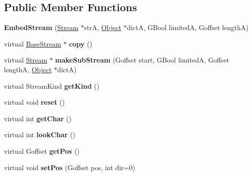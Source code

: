 \subsection*{Public Member Functions}
\begin{DoxyCompactItemize}
\item 
\mbox{\label{class_embed_stream_a624ea287f9ba21a0ea17b5d20aa50df6}} 
{\bfseries Embed\+Stream} (\hyperlink{class_stream}{Stream} $\ast$strA, \hyperlink{class_object}{Object} $\ast$dictA, G\+Bool limitedA, Goffset lengthA)
\item 
\mbox{\label{class_embed_stream_aeffc51f2d93a1c34e88bfc3a77dc9ee7}} 
virtual \hyperlink{class_base_stream}{Base\+Stream} $\ast$ {\bfseries copy} ()
\item 
\mbox{\label{class_embed_stream_a6165cfe55a7d4c1e8a57ff18ef4bd179}} 
virtual \hyperlink{class_stream}{Stream} $\ast$ {\bfseries make\+Sub\+Stream} (Goffset start, G\+Bool limitedA, Goffset lengthA, \hyperlink{class_object}{Object} $\ast$dictA)
\item 
\mbox{\label{class_embed_stream_a6e8cf15102919fdb0f79b0d3ea5d5063}} 
virtual Stream\+Kind {\bfseries get\+Kind} ()
\item 
\mbox{\label{class_embed_stream_a1729f8382772524a2837396d1674dd20}} 
virtual void {\bfseries reset} ()
\item 
\mbox{\label{class_embed_stream_afb5b8585b2438f2532fc8c9a8377989e}} 
virtual int {\bfseries get\+Char} ()
\item 
\mbox{\label{class_embed_stream_a815e07de933c9b86594e3b32a441aa9c}} 
virtual int {\bfseries look\+Char} ()
\item 
\mbox{\label{class_embed_stream_ac8fe0211cc0394166788d194a8b51167}} 
virtual Goffset {\bfseries get\+Pos} ()
\item 
\mbox{\label{class_embed_stream_aa0b406a949ac059547ba93600184e287}} 
virtual void {\bfseries set\+Pos} (Goffset pos, int dir=0)
\item 

\end{DoxyCompactItemize}
